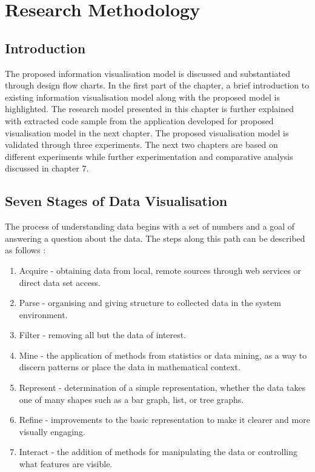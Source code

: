 
\chapter{Research Methodology} %

\label{Chapter3} %



\section{Introduction}

The proposed information visualisation model is discussed and substantiated through design flow charts. In the first part of the chapter, a brief introduction to existing information visualisation model along with the proposed model is highlighted. The research model presented in this chapter is further explained with extracted code sample from the application developed for proposed visualisation model in the next chapter. The proposed visualisation model is validated through three experiments. The next two chapters are based on different experiments while further experimentation and comparative analysis discussed in chapter 7.

\section{Seven Stages of Data Visualisation}

The process of understanding data begins with a set of numbers and a goal of answering a question about the data. The steps along this path can be described as follows \cite{fry}:

\begin{enumerate}
\item Acquire - obtaining data from local, remote sources through web services or direct data set access.
\item Parse - organising and giving structure to collected data in the system environment. 
\item Filter - removing all but the data of interest.
\item Mine - the application of methods from statistics or data mining, as a way to discern patterns or place the data in mathematical context.
\item Represent - determination of a simple representation, whether the data takes one of many shapes such as a bar graph, list, or tree graphs.
\item Refine - improvements to the basic representation to make it clearer and more visually engaging.
\item Interact - the addition of methods for manipulating the data or controlling what features are visible.
\end{enumerate}

